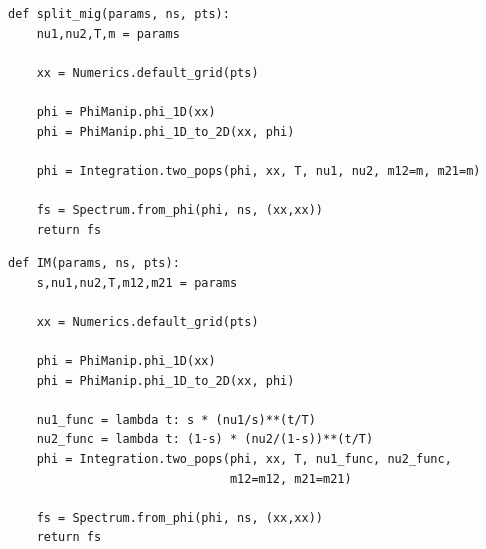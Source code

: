 \documentclass[12pt]{article}
\makeatletter
\newcommand{\py}[1]{\lstinline[language=Python, showstringspaces=False]@#1@}
\makeatother
\begin{document}
\begin{lstlisting}[caption={\textbf{Split with migration:} At time \py{T} in the past, two population diverge from an equilibrium population, with relative sizes \py{nu1} and \py{nu2} and with symmetric migration at rate \py{m}.}, float]
def split_mig(params, ns, pts):
    nu1,nu2,T,m = params

    xx = Numerics.default_grid(pts)

    phi = PhiManip.phi_1D(xx)
    phi = PhiManip.phi_1D_to_2D(xx, phi)

    phi = Integration.two_pops(phi, xx, T, nu1, nu2, m12=m, m21=m)

    fs = Spectrum.from_phi(phi, ns, (xx,xx))
    return fs
\end{lstlisting}

\begin{lstlisting}[caption={\textbf{Two-population isolation-with-migration:} The ancestral population splits into two, with a fraction \py{s} going into pop 1 and fraction \py{1-s} into pop 2. The populations then grow exponentially, with asymmetric migration allowed between them.}, float]
def IM(params, ns, pts):
    s,nu1,nu2,T,m12,m21 = params

    xx = Numerics.default_grid(pts)

    phi = PhiManip.phi_1D(xx)
    phi = PhiManip.phi_1D_to_2D(xx, phi)

    nu1_func = lambda t: s * (nu1/s)**(t/T)
    nu2_func = lambda t: (1-s) * (nu2/(1-s))**(t/T)
    phi = Integration.two_pops(phi, xx, T, nu1_func, nu2_func,
                               m12=m12, m21=m21)

    fs = Spectrum.from_phi(phi, ns, (xx,xx))
    return fs
\end{lstlisting}
\end{document}
